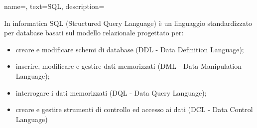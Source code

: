 {
    name=,
    text=SQL,
    description={In informatica SQL (Structured Query Language) è un linguaggio standardizzato per database basati sul modello relazionale progettato per:
\begin{itemize}
	\item creare e modificare schemi di database (DDL - Data Definition Language);
	\item inserire, modificare e gestire dati memorizzati (DML - Data Manipulation
Language);
	\item interrogare i dati memorizzati (DQL - Data Query Language);
	\item creare e gestire strumenti di controllo ed accesso ai dati (DCL - Data Control
Language)
\end{itemize}}
}

